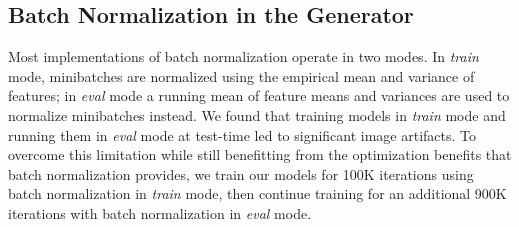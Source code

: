 \documentclass[10pt,twocolumn,letterpaper]{article}
\begin{document}
\begin{table}
  \centering
  \setlength{\tabcolsep}{1mm}
  \vspace{1mm}
  \caption{
    Architecture of our Cascaded Refinement Network. CRM is a Cascaded Refinement Module,
    shown in Table~\ref{tab:crn-module}. LeakyReLU uses a negative slope of 0.2.
  }
  \label{tab:crn-net}
\end{table}

\subsection{Batch Normalization in the Generator}
Most implementations of batch normalization operate in two modes. In \emph{train} mode,
minibatches are normalized using the empirical mean and variance of features; in \emph{eval}
mode a running mean of feature means and variances are used to normalize minibatches instead.
We found that training models in \emph{train} mode and running them in \emph{eval} mode at
test-time led to significant image artifacts. To overcome this limitation while still
benefitting from the optimization benefits that batch normalization provides, we train
our models for 100K iterations using batch normalization in \emph{train} mode, then
continue training for an additional 900K iterations with batch normalization in \emph{eval}
mode.
\end{document}
